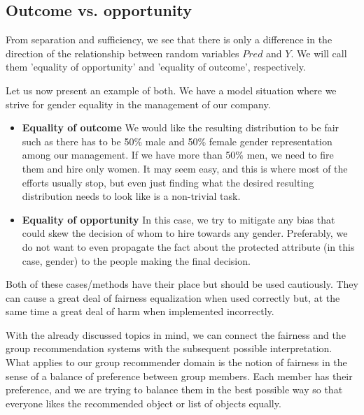 \subsection{Outcome vs. opportunity}
From separation and sufficiency, we see that there is only a difference in the direction of the relationship between random variables $Pred$ and $Y$. We will call them 'equality of opportunity' and 'equality of outcome', respectively.

Let us now present an example of both. We have a model situation where we strive for gender equality in the management of our company.

\begin{itemize}

    \item \textbf{Equality of outcome}
    We would like the resulting distribution to be fair such as there has to be 50\% male and 50\% female gender representation among our management. If we have more than 50\% men, we need to fire them and hire only women. It may seem easy, and this is where most of the efforts usually stop, but even just finding what the desired resulting distribution needs to look like is a non-trivial task.
    \item \textbf{Equality of opportunity}
    In this case, we try to mitigate any bias that could skew the decision of whom to hire towards any gender. Preferably, we do not want to even propagate the fact about the protected attribute (in this case, gender) to the people making the final decision.
    
\end{itemize}


Both of these cases/methods have their place but should be used cautiously. They can cause a great deal of fairness equalization when used correctly but, at the same time a great deal of harm when implemented incorrectly.


With the already discussed topics in mind, we can connect the fairness and the group recommendation systems with the subsequent possible interpretation. What applies to our group recommender domain is the notion of fairness in the sense of a balance of preference between group members. Each member has their preference, and we are trying to balance them in the best possible way so that everyone likes the recommended object or list of objects equally.

